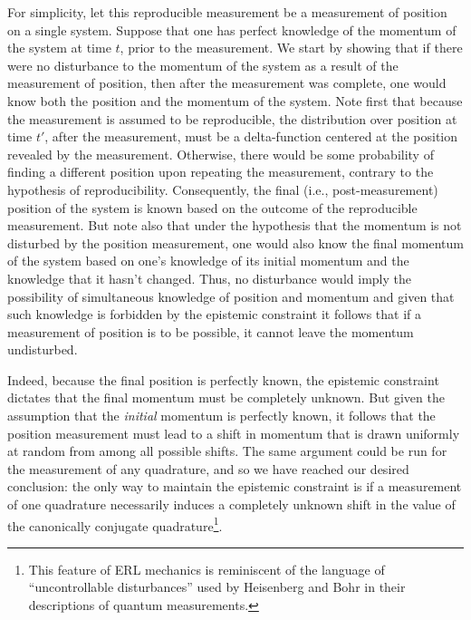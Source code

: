 \documentclass[pra,superscriptaddress,nofootinbib,12pt]{revtex4-2}
\begin{document}
For simplicity, let this reproducible measurement be a measurement of position on a single system.  Suppose that one has perfect knowledge of the momentum of the system at time $t$, prior to the measurement.  We start by showing that if there were no disturbance to the momentum of the system as a result of the measurement of position, then after the measurement was complete, one would know both the position and the momentum of the system.  Note first that because the measurement is assumed to be reproducible, the distribution over position at time $t'$, after the measurement, must be a delta-function centered at the position revealed by the measurement.  Otherwise, there would be some probability of finding a different position upon repeating the measurement, contrary to the hypothesis of reproducibility.  Consequently, the final (i.e., post-measurement) position of the system is known based on the outcome of the reproducible measurement.  But note also that under the hypothesis that the momentum is not disturbed by the position measurement, one would also know the final momentum of the system based on one's knowledge of its initial momentum and the knowledge that it hasn't changed. Thus, no disturbance would imply the possibility of simultaneous knowledge of position and momentum and given that such knowledge is forbidden by the epistemic constraint it follows that if a measurement of position is to be possible, it cannot leave the momentum undisturbed.

Indeed, because the final position is perfectly known, the epistemic constraint dictates that the final momentum must be completely unknown.  But given the assumption that the \emph{initial} momentum is perfectly known, it follows that the position measurement must lead to a shift in momentum that is drawn uniformly at random from among all possible shifts.  The same argument could be run for the measurement of any quadrature, and so we have reached our desired conclusion: the only way to maintain the epistemic constraint is if a measurement of one quadrature necessarily induces a completely unknown shift in the value of the canonically conjugate quadrature\footnote{This feature of ERL mechanics is reminiscent of the language of ``uncontrollable disturbances'' used by Heisenberg and Bohr in their descriptions of quantum measurements.}.
\end{document}
